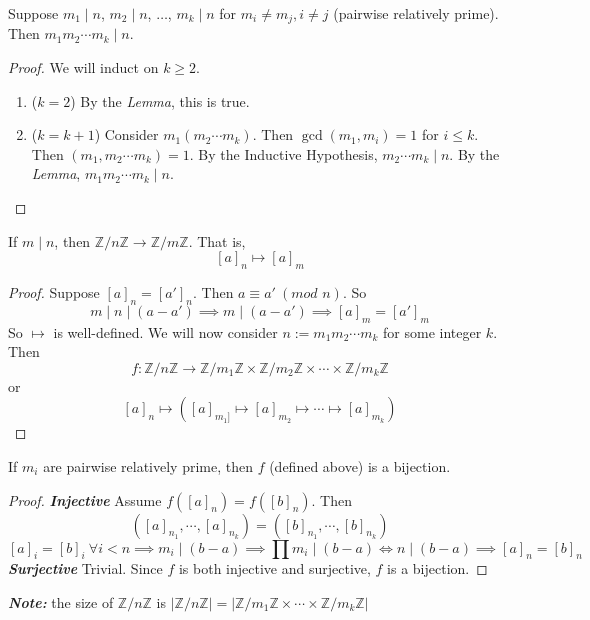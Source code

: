 \documentclass{report}
\newcommand{\Z}{\mathbb{Z}}
\newcommand{\modclass}[1]{\Z/{#1}\Z}
\newcommand{\textib}[1]{\textit{\textbf{{#1}}}}
\newcommand{\proposition}[1]{\begin{tcolorbox}[title=\textit{Proposition}]{#1}\end{tcolorbox}}
\newcommand{\corollary}[1]{\begin{tcolorbox}[title=\textit{Corollary}]{#1}\end{tcolorbox}}
\newcommand{\theorem}[1]{\begin{tcolorbox}[title=\textit{Theorem}]{#1}\end{tcolorbox}}
\renewcommand{\mod}[1]{\ (\textit{mod } {#1})}
\begin{document}
\corollary {
    Suppose $m_1 \mid n$, $m_2 \mid n$, $\ldots$, $m_k \mid n$ for $m_i \neq m_j, i \neq j$ (pairwise
    relatively prime). Then $m_1 m_2 \cdots m_k \mid n$.
}
\begin{proof}
    We will induct on $k \geq 2$.
    \begin{enumerate}[label=\textit{(\roman*)}]
        \item ($k = 2$) By the \textit{Lemma}, this is true.
        \item ($k = k + 1$) Consider $m_1 (m_2 \cdots m_k)$. Then $\gcd(m_1, m_i) = 1$ for $i \leq k$.
            Then $(m_1, m_2 \cdots m_k) = 1$. By the Inductive Hypothesis, $m_2 \cdots m_k \mid n$. By
            the \textit{Lemma}, $m_1 m_2 \cdots m_k \mid n$.
    \end{enumerate}
\end{proof}


\proposition { 
    If $m \mid n$, then $\modclass{n} \to \modclass{m}$. That is,
    \[[a]_n \mapsto [a]_m\]
}
\begin{proof}
    Suppose $[a]_n = [a']_n$. Then $a \equiv a' \mod{n}$. So 
    \[m \mid n \mid (a - a') \implies m \mid (a - a') \implies [a]_m = [a']_m\]
    So $\mapsto$ is well-defined.
    \newline
    \newline
    We will now consider $n := m_1 m_2 \cdots m_k$ for some integer $k$. Then
    \[f : \modclass{n} \to \modclass{m_1} \times \modclass{m_2} \times \cdots \times \modclass{m_k}\]
    or
    \[[a]_n \mapsto \left( [a]_{m_1]} \mapsto [a]_{m_2} \mapsto \cdots \mapsto [a]_{m_k} \right)\]
\end{proof}

\theorem {
    If $m_i$ are pairwise relatively prime, then $f$ (defined above) is a bijection.
}
\begin{proof}
    \textib{Injective}
    \newline
    Assume $f([a]_n) = f([b]_n)$. Then
    \[([a]_{n_1}, \cdots, [a]_{n_k}) = ([b]_{n_1}, \cdots, [b]_{n_k})\]
    \[[a]_i = [b]_i \ \forall i < n \implies m_i \mid (b - a) \implies \prod m_i \mid (b - a) \iff n \mid (b - a) \implies [a]_n = [b]_n\]
    \textib{Surjective}
    \newline
    Trivial. Since $f$ is both injective and surjective, $f$ is a bijection.
\end{proof}

\textib{Note:} the size of $\modclass{n}$ is $|\modclass{n}| = |\modclass{m_1} \times \cdots \times \modclass{m_k}|$
\end{document}

